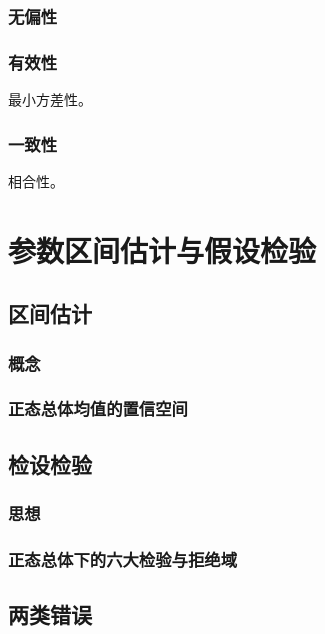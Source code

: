 \documentclass[UTF8, 12pt]{ctexart}
\begin{document}
\subsubsection{无偏性}

\subsubsection{有效性}

最小方差性。

\subsubsection{一致性}

相合性。

\section{参数区间估计与假设检验}

\subsection{区间估计}

\subsubsection{概念}

\subsubsection{正态总体均值的置信空间}

\subsection{检设检验}

\subsubsection{思想}

\subsubsection{正态总体下的六大检验与拒绝域}

\subsection{两类错误}
\end{document}
